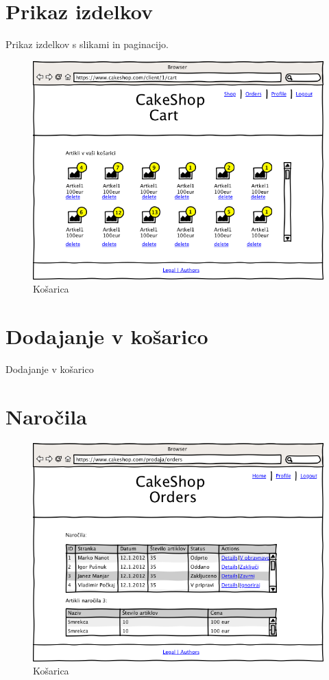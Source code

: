 \documentclass[a4paper,12pt]{report}
\begin{document}
\newpage

\section{Prikaz izdelkov}

Prikaz izdelkov s slikami in paginacijo.

\begin{figure}[htb]
	\centering
	\includegraphics[width=13cm]{Wireframes/cakeshop/pngs/020200-CartViewClient.png}
	\caption{Košarica}
\label{fig:1}
\end{figure}

\section{Dodajanje v košarico}

Dodajanje v košarico

\section{Naročila}

\begin{figure}[htb]
	\centering
	\includegraphics[width=13cm]{Wireframes/cakeshop/pngs/030300-OrdersSalesman.png}
	\caption{Košarica}
\label{fig:1}
\end{figure}
\end{document}
